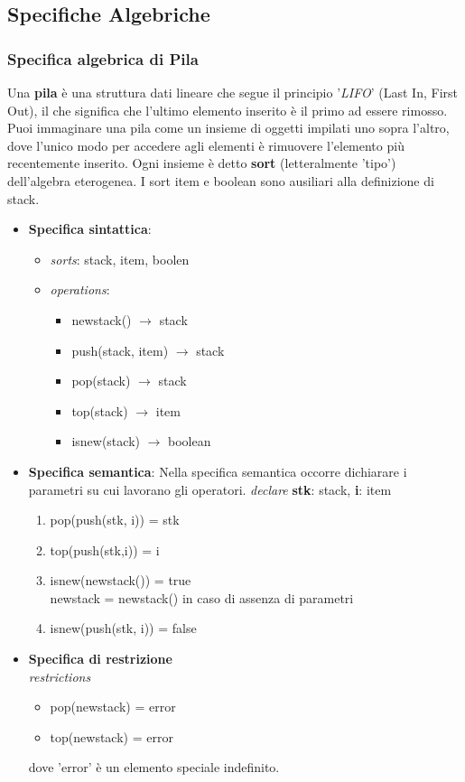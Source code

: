 \documentclass{article}
\begin{document}
	\subsection{Specifiche Algebriche}
	\subsubsection{Specifica algebrica di Pila}
	Una \textbf{pila} è una struttura dati lineare che segue il principio '\textit{LIFO}' (Last In, First Out), il che significa che l'ultimo elemento inserito è il primo ad essere rimosso. Puoi immaginare una pila come un insieme di oggetti impilati uno sopra l'altro, dove l'unico modo per accedere agli elementi è rimuovere l'elemento più recentemente inserito.
	Ogni insieme è detto \textbf{sort} (letteralmente 'tipo') dell'algebra eterogenea. I sort item e boolean sono ausiliari alla definizione di stack.
	\begin{itemize}
		\item \textbf{Specifica sintattica}:
		\begin{itemize}
			\item \textit{sorts}: stack, item, boolen
			\item \textit{operations}:
			\begin{itemize}
				\item newstack() $\rightarrow$ stack
				\item push(stack, item) $\rightarrow$ stack
				\item pop(stack) $\rightarrow$ stack
				\item top(stack) $\rightarrow$ item
				\item isnew(stack) $\rightarrow$ boolean
			\end{itemize}
		\end{itemize}
		\item \textbf{Specifica semantica}: 
		Nella specifica semantica occorre dichiarare i parametri su cui lavorano gli operatori.
		\textit{declare} \textbf{stk}: stack, \textbf{i}: item
		\begin{enumerate}
			\item pop(push(stk, i)) = stk
			\item top(push(stk,i)) = i
			\item isnew(newstack()) = true \\ newstack = newstack() in caso di assenza di parametri
			\item isnew(push(stk, i)) = false
		\end{enumerate}
		\item \textbf{Specifica di restrizione} \\ \textit{restrictions}
		\begin{itemize}
			\item pop(newstack) = error
			\item top(newstack) = error
		\end{itemize}
		dove 'error' è un elemento speciale indefinito.
	\end{itemize}
\end{document}
